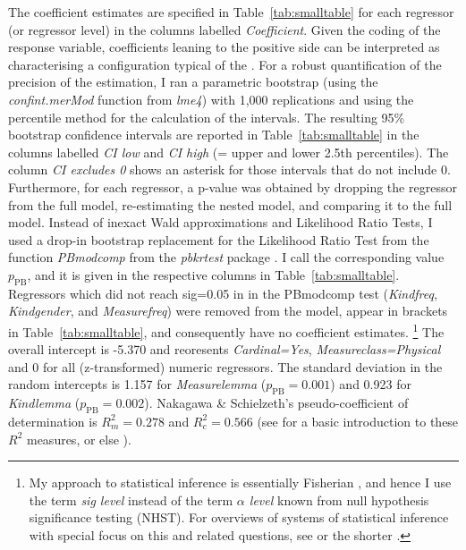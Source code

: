 The coefficient estimates are specified in Table~\ref{tab:smalltable} for each regressor (or regressor level) in the columns labelled \textit{Coefficient}.
Given the coding of the response variable, coefficients leaning to the positive side can be interpreted as characterising a configuration typical of the \PGCd.
For a robust quantification of the precision of the estimation, I ran a parametric bootstrap (using the \mbox{\textit{confint.merMod}} function from \textit{lme4}) with 1,000 replications and using the percentile method for the calculation of the intervals.
The resulting 95\% bootstrap confidence intervals are reported in Table~\ref{tab:smalltable} in the columns labelled \textit{CI low} and \textit{CI high} (= upper and lower 2.5th percentiles).
The column \textit{CI excludes 0} shows an asterisk for those intervals that do not include 0.
Furthermore, for each regressor, a p-value was obtained by dropping the regressor from the full model, re-estimating the nested model, and comparing it to the full model.
Instead of inexact Wald approximations and Likelihood Ratio Tests, I used a drop-in bootstrap replacement for the Likelihood Ratio Test from the function \textit{PBmodcomp} from the \textit{pbkrtest} package \citep{HalekohHojsgaard2014}.
I call the corresponding value $p_{\text{PB}}$, and it is given in the respective columns in Table~\ref{tab:smalltable}.
Regressors which did not reach sig=0.05 in in the PBmodcomp test (\textit{Kindfreq}, \textit{Kindgender}, and \textit{Measurefreq}) were removed from the model, appear in brackets in Table~\ref{tab:smalltable}, and consequently have no coefficient estimates.%
\footnote{My approach to statistical inference is essentially Fisherian \citep{Fisher1935,Fisher1959}, and hence I use the term \textit{sig level} instead of the term \textit{$\alpha$ level} known from null hypothesis significance testing (NHST).
For overviews of systems of statistical inference with special focus on this and related questions, see \citet{Lehmann1993,Lehmann2011} or the shorter \citet{Perezgonzalez2015}.}
The overall intercept is -5.370 and reoresents \textit{Cardinal=Yes}, \textit{Measureclass=Physical} and 0 for all (z-transformed) numeric regressors.
The standard deviation in the random intercepts is 1.157 for \textit{Measurelemma} ($p_{\text{PB}}=0.001$) and 0.923 for \textit{Kindlemma} ($p_{\text{PB}}=0.002$).
Nakagawa \& Schielzeth's pseudo-coefficient of determination is $R_m^2=0.278$ and $R^2_c=0.566$ (see \citealp{Gries2015} for a basic introduction to these $R^2$ measures, or else \citealp{NakagawaSchielzeth2013}).

